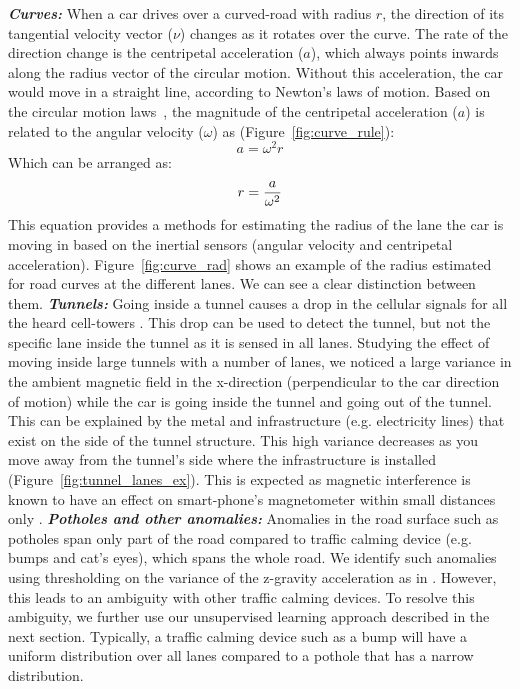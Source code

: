 \documentclass[10pt, conference, compsocconf]{IEEEtran}
\begin{document}
\noindent\textbf{\textit{Curves:}}
When a car drives over a curved-road with radius $r$, the direction of its tangential velocity vector ($\nu$) changes as it rotates over the curve. The rate of the direction change is the centripetal acceleration ($a$), which always points inwards along the radius vector of the circular motion. Without this acceleration, the car would move in a straight line, according to Newton's laws of motion. Based on the circular motion laws~\cite{serway2013physics}, the magnitude of the centripetal acceleration ($a$) is related to the angular velocity ($\omega$) as (Figure~\ref{fig:curve_rule}):
\begin{equation}
a = \omega^2 r
\label{eq:cent_acc}
\end{equation}
Which can be arranged as:
\begin{eqnarray}
r = \frac{a}{\omega^2}\label{eq:omega_r}
\vspace*{-6pt}
\end{eqnarray}
This equation provides a methods for estimating the radius of the lane the car is moving in based on the inertial sensors (angular velocity and centripetal acceleration).
Figure~\ref{fig:curve_rad} shows an example of the radius estimated for road curves at the different lanes. We can see a clear distinction between them.  
\noindent\textbf{\textit{Tunnels:}}
Going inside a tunnel causes a drop in the cellular signals for all the heard cell-towers \cite{aly2013dejavu}. This drop can be used to detect the tunnel, but not the specific lane inside the tunnel as it is sensed in all lanes. Studying the effect of moving inside large tunnels with a number of lanes, we noticed a large variance in the ambient magnetic field in the x-direction (perpendicular to the car direction of motion) while the car is going inside the tunnel and going out of the tunnel. This can be explained by the metal and infrastructure (e.g. electricity lines) that exist on the side of the tunnel structure. This high variance decreases as you move away from the tunnel's side where the infrastructure is installed (Figure~\ref{fig:tunnel_lanes_ex}). This is expected as magnetic interference is known to have an effect on smart-phone's magnetometer within small distances only \cite{chung2011indoor}. 
\noindent\textbf{\textit{Potholes and other anomalies:}}
Anomalies in the road surface such as potholes span only part of the road compared to traffic calming device (e.g. bumps and cat's eyes), which spans the whole road. We identify such anomalies
using thresholding on the variance of the z-gravity acceleration as in \cite{mednis2011real}. However, this leads to an ambiguity with other traffic calming devices. To resolve this ambiguity, we further use our unsupervised learning approach described in the next section. Typically, a traffic calming device such as a bump will have a uniform distribution over all lanes compared to a pothole that has a narrow distribution. 
\end{document}
